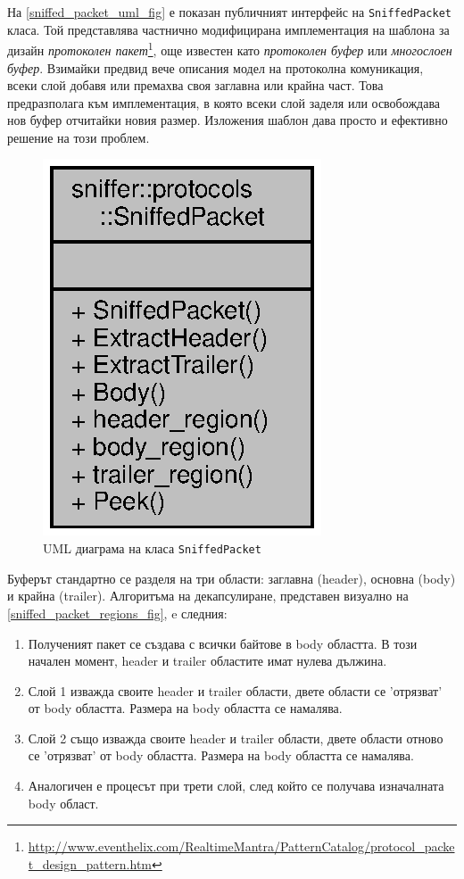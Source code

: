 \documentclass[12pt,a4paper,oneside]{book}
\begin{document}
На \autoref{sniffed_packet_uml_fig} е показан публичният интерфейс на
\texttt{SniffedPacket} класа. Той представлява частнично модифицирана
имплементация на шаблона за дизайн \textit{протоколен
пакет}\footnote{\url{http://www.eventhelix.com/RealtimeMantra/PatternCatalog/protocol_packet_design_pattern.htm}}, още известен като
\textit{протоколен буфер} или \textit{многослоен буфер}. Взимайки предвид
вече описания модел на протоколна комуникация,
всеки слой добавя или премахва своя заглавна или крайна част.
Това предразполага към имплементация, в която всеки слой заделя или освобождава
нов буфер отчитайки новия размер. Изложения шаблон дава просто и ефективно
решение на този проблем.

\begin{figure}[h!]
  \centering
  \includegraphics[scale=.7]{figures/sniffed_packet_uml.eps}
  \caption{UML диаграма на класа \texttt{SniffedPacket}}
  \label{sniffed_packet_uml_fig}
\end{figure}

Буферът стандартно се разделя на три области: заглавна (header), основна (body)
и крайна (trailer).
Алгоритъма на декапсулиране, представен визуално на
\autoref{sniffed_packet_regions_fig}, e следния:

\begin{enumerate}
  \item
    Полученият пакет се създава с всички байтове в body областта. В този начален
    момент, header и trailer областите имат нулева дължина.
\item
  Слой 1 изважда своите header и trailer области, двете области се 'отрязват' от
  body областта. Размера на body областта се намалява.
\item
  Слой 2 също изважда своите header и trailer области, двете области отново се
  'отрязват' от body областта. Размера на body областта се намалява.
\item
  Аналогичен е процесът при трети слой, след който се получава изначалната body
  област.
\end{enumerate}
\end{document}
